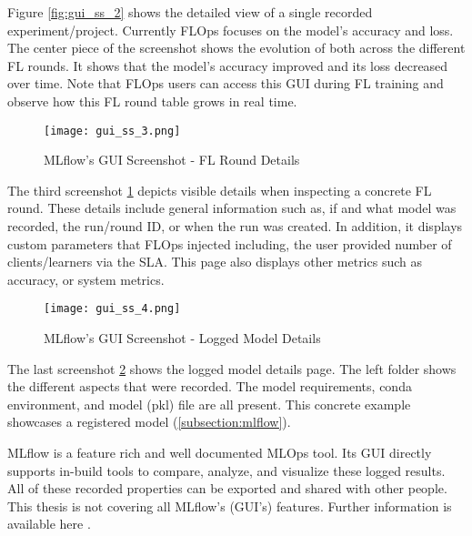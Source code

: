 Figure \ref{fig:gui_ss_2} shows the detailed view of a single recorded experiment/project.
Currently FLOps focuses on the model's accuracy and loss.
The center piece of the screenshot shows the evolution of both across the different FL rounds.
It shows that the model's accuracy improved and its loss decreased over time.
Note that FLOps users can access this GUI during FL training and observe how this FL round table grows in real time.

\begin{figure}[p]
    \centering
    \texttt{[image: gui\_ss\_3.png]}
    \caption{MLflow's GUI Screenshot - FL Round Details}
    \label{fig:gui_ss_3}
\end{figure}

The third screenshot \ref{fig:gui_ss_3} depicts visible details when inspecting a concrete FL round.
These details include general information such as, if and what model was recorded, the run/round ID, or when the run was created.
In addition, it displays custom parameters that FLOps injected including, the user provided number of clients/learners via the SLA.
This page also displays other metrics such as accuracy, or system metrics.

\begin{figure}[p]
    \begin{adjustwidth}{-0.1\paperwidth}{-0.1\paperwidth}
        \centering
        \texttt{[image: gui\_ss\_4.png]}
        \caption{MLflow's GUI Screenshot - Logged Model Details}
        \label{fig:gui_ss_4}
    \end{adjustwidth}
\end{figure}

The last screenshot \ref{fig:gui_ss_4} shows the logged model details page.
The left folder shows the different aspects that were recorded.
The model requirements, conda environment, and model (pkl) file are all present.
This concrete example showcases a registered model (\ref{subsection:mlflow}).

MLflow is a feature rich and well documented MLOps tool.
Its GUI directly supports in-build tools to compare, analyze, and visualize these logged results.
All of these recorded properties can be exported and shared with other people.
This thesis is not covering all MLflow's (GUI's) features.
Further information is available here \cite{mlflow:homepage,mlflow:docs}.